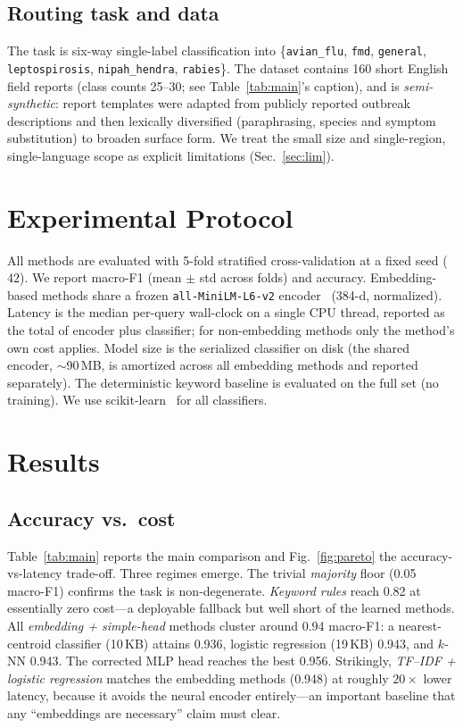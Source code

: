 \documentclass[runningheads]{llncs}
\begin{document}
\subsection{Routing task and data}
The task is six-way single-label classification into
\{\texttt{avian\_flu}, \texttt{fmd}, \texttt{general}, \texttt{leptospirosis},
\texttt{nipah\_hendra}, \texttt{rabies}\}. The dataset contains 160 short English
field reports (class counts 25--30; see Table~\ref{tab:main}'s caption), and is
\emph{semi-synthetic}: report templates were adapted from publicly reported
outbreak descriptions and then lexically diversified (paraphrasing, species and
symptom substitution) to broaden surface form. We treat the small size and
single-region, single-language scope as explicit limitations (Sec.~\ref{sec:lim}).

\section{Experimental Protocol}
All methods are evaluated with 5-fold stratified cross-validation at a fixed seed
($42$). We report macro-F1 (mean $\pm$ std across folds) and accuracy.
Embedding-based methods share a frozen \texttt{all-MiniLM-L6-v2}
encoder~\cite{wang2020minilm} (384-d, normalized). Latency is the median per-query
wall-clock on a single CPU thread, reported as the total of encoder plus
classifier; for non-embedding methods only the method's own cost applies. Model
size is the serialized classifier on disk (the shared encoder, $\sim$90\,MB, is
amortized across all embedding methods and reported separately). The deterministic
keyword baseline is evaluated on the full set (no training). We use
scikit-learn~\cite{pedregosa2011sklearn} for all classifiers.

\section{Results}
\subsection{Accuracy vs.\ cost}
Table~\ref{tab:main} reports the main comparison and Fig.~\ref{fig:pareto} the
accuracy-vs-latency trade-off. Three regimes emerge. The trivial \emph{majority}
floor (0.05 macro-F1) confirms the task is non-degenerate. \emph{Keyword rules}
reach 0.82 at essentially zero cost---a deployable fallback but well short of the
learned methods. All \emph{embedding + simple-head} methods cluster around
0.94 macro-F1: a nearest-centroid classifier (10\,KB) attains 0.936, logistic
regression (19\,KB) 0.943, and $k$-NN 0.943. The corrected MLP head reaches the
best 0.956. Strikingly, \emph{TF--IDF + logistic regression} matches the embedding
methods (0.948) at roughly $20\times$ lower latency, because it avoids the neural
encoder entirely---an important baseline that any ``embeddings are necessary''
claim must clear.
\end{document}
